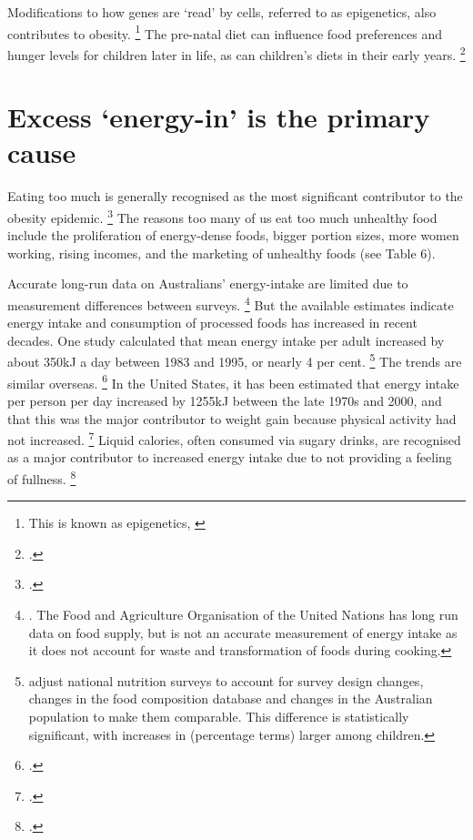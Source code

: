 \documentclass[embargoed]{grattan}
\begin{document}
Modifications to how genes are `read' by cells, referred to as epigenetics, also contributes to obesity.%
\footnote{This is known as epigenetics, \textcite{Australia2014NoTimeWeight}} The pre-natal diet can influence food preferences and hunger levels for children later in life, as can children's diets in their early years.%
\footcites{Li2010Epigeneticprogrammingmaternal}{Ebbeling2002Childhoodobesitypublic}

\section{Excess `energy-in' is the primary cause}\label{excess-energy-in-is-the-primary-cause}

Eating too much is generally recognised as the most significant contributor to the obesity epidemic.%
\footcites{Finkelstein2010EconomicsObesity}{Organisation2000Obesitypreventingmanaging}{Bray2004Consumptionhighfructose}{Ewart-Pierce2016WholeCommunityObesity}{Karnani2016ObesityCrisisas}{Livingston2012JAMAobesitytheme}{Roberto2015Patchyprogressobesity}{Tataranni2003Bodyweightgain}{Stunkard1999Energyintakenot}{Swinburn2006Estimatingeffectsenergy}{Drewnowski2005economicsobesitydietary} The reasons too many of us eat too much unhealthy food include the proliferation of energy-dense foods, bigger portion sizes, more women working, rising incomes, and the marketing of unhealthy foods (see Table 6).

Accurate long-run data on Australians' energy-intake are limited due to measurement differences between surveys.%
\footnote{\textcites{Health2012Australiasfood}{Bleich2007Whyisdeveloped}.
The Food and Agriculture Organisation of the United Nations has long run data on food supply, but is not an accurate measurement of energy intake as it does not account for waste and transformation of foods during cooking.} But the available estimates indicate energy intake and consumption of processed foods has increased in recent decades.
One study calculated that mean energy intake per adult increased by about 350kJ a day between 1983 and 1995, or nearly 4 per cent.%
\footnote{\textcite{Cook2001Comparabledatafood} adjust national nutrition surveys to account for survey design changes, changes in the food composition database and changes in the Australian population to make them comparable.
This difference is statistically significant, with increases in (percentage terms) larger among children.} The trends are similar overseas.%
\footcites{Cavadini2000USadolescentfood}{Nielsen2002Trendsenergyintake}{Bleich2007Whyisdeveloped} In the United States, it has been estimated that energy intake per person per day increased by 1255kJ between the late 1970s and 2000, and that this was the major contributor to weight gain because physical activity had not increased.%
\footcite{Woodward-Lopez2010whatextenthave} Liquid calories, often consumed via sugary drinks, are recognised as a major contributor to increased energy intake due to not providing a feeling of fullness.%
\footcites{Woodward-Lopez2010whatextenthave}{Johnson2009Dietarysugarsintake}
\end{document}
